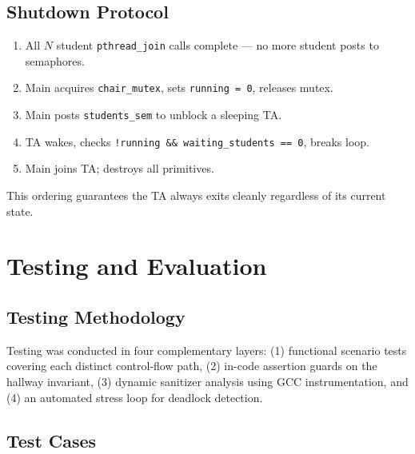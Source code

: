 \documentclass[12pt,a4paper]{report}
\begin{document}
\section{Shutdown Protocol}

\begin{enumerate}[leftmargin=2em,itemsep=1pt]
  \item All $N$ student \texttt{pthread\_join} calls complete --- no more student posts to semaphores.
  \item Main acquires \texttt{chair\_mutex}, sets \texttt{running = 0}, releases mutex.
  \item Main posts \texttt{students\_sem} to unblock a sleeping TA.
  \item TA wakes, checks \texttt{!running \&\& waiting\_students == 0}, breaks loop.
  \item Main joins TA; destroys all primitives.
\end{enumerate}

This ordering guarantees the TA always exits cleanly regardless of its current state.

\chapter{Testing and Evaluation}

\section{Testing Methodology}

Testing was conducted in four complementary layers: (1) functional scenario tests covering
each distinct control-flow path, (2) in-code assertion guards on the hallway invariant,
(3) dynamic sanitizer analysis using GCC instrumentation, and (4) an automated stress loop for
deadlock detection.

\section{Test Cases}
\end{document}
